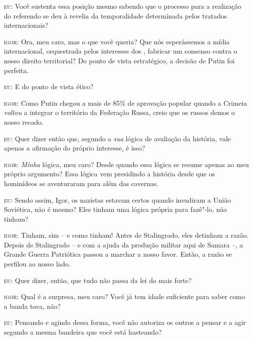 \textsc{eu:} Você sustenta essa posição mesmo sabendo que o processo
para a realização do referendo se deu à revelia da temporalidade
determinada pelos tratados internacionais?

\textsc{igor:} Ora, meu caro, mas o que você queria? Que nós
esperássemos a mídia internacional, orquestrada pelos interesses dos
, fabricar um consenso contra o nosso direito territorial? Do ponto
de vista estratégico, a decisão de Putin foi perfeita.

\textsc{eu:} E do ponto de vista ético?

\textsc{igor:} Como Putin chegou a mais de 85\% de aprovação popular
quando a Crimeia \emph{voltou} a integrar o território da Federação
Russa, creio que os russos demos o nosso recado.

\textsc{eu:} Quer dizer então que, segundo a \emph{sua} lógica de
avaliação da história, vale apenas a afirmação do próprio interesse, é
isso?

\textsc{igor:} \emph{Minha} lógica, meu caro? Desde quando essa lógica
se resume apenas ao meu próprio argumento? Essa lógica vem presidindo a
história desde que os hominídeos se aventuraram para além das cavernas.

\textsc{eu:} Sendo assim, Igor, os nazistas estavam certos quando
invadiram a União Soviética, não é mesmo? Eles tinham uma lógica própria
para fazê"-lo, não tinham?

\textsc{igor:} Tinham, sim -- e como tinham! Antes de Stalingrado, eles
detinham a razão. Depois de Stalingrado -- e com a ajuda da produção
militar aqui de Samara --, a Grande Guerra Patriótica passou a marchar a
nosso favor. Então, a razão se perfilou ao nosso lado.

\textsc{eu:} Quer dizer, então, que tudo não passa da lei do mais forte?

\textsc{igor:} Qual é a surpresa, meu caro? Você já tem idade suficiente
para saber como a banda toca, não?

\textsc{eu:} Pensando e agindo dessa forma, você não autoriza os outros
a pensar e a agir segundo a mesma bandeira que você está hasteando?


